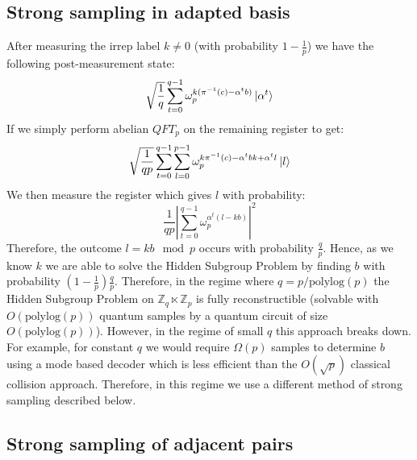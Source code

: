 \subsection{Strong sampling in adapted basis}
After measuring the irrep label $k \neq 0$ (with probability $1-\frac{1}{p}$) we have the following post-measurement state:
\begin{equation}
    \sqrt{\frac{1}{q}}\sum_{t=0}^{q-1} \omega_p^{k (\pi^{-1}(c) - \alpha^tb)}\ket{\alpha^t}
\end{equation}
If we simply perform abelian $QFT_p$ on the remaining register to get:
\begin{equation}
    \sqrt{\frac{1}{qp}}\sum_{t=0}^{q-1}\sum_{l=0}^{p-1} \omega_p^{k \pi^{-1}(c) - \alpha^tbk + \alpha^t l}\ket{l}
\end{equation}
We then measure the register which gives $l$ with probability:
\begin{equation}
    \frac{1}{qp}\left|\sum_{t=0}^{q-1} \omega_p^{ \alpha^t(l-kb)}\right|^2
\end{equation}
Therefore, the outcome $l=kb \mod p$ occurs with probability $\frac{q}{p}$. Hence, as we know $k$ we are able to solve the Hidden Subgroup Problem by finding $b$ with probability $(1-\frac{1}{p})\frac{q}{p}$. Therefore, in the regime where $q = p/\text{polylog}(p)$ the Hidden Subgroup Problem on $\mathbb{Z}_q \ltimes \mathbb{Z}_p$ is fully reconstructible (solvable with $O(\text{polylog} (p))$ quantum samples by a quantum circuit of size $O(\text{polylog} (p))$).  However, in the regime of small $q$ this approach breaks down. For example, for constant $q$ we would require $\Omega(p)$ samples to determine $b$ using a mode based decoder which is less efficient than the $O(\sqrt{p})$ classical collision approach. Therefore, in this regime we use a different method of strong sampling described below.

\subsection{Strong sampling of adjacent pairs}
\label{section:pairs}

